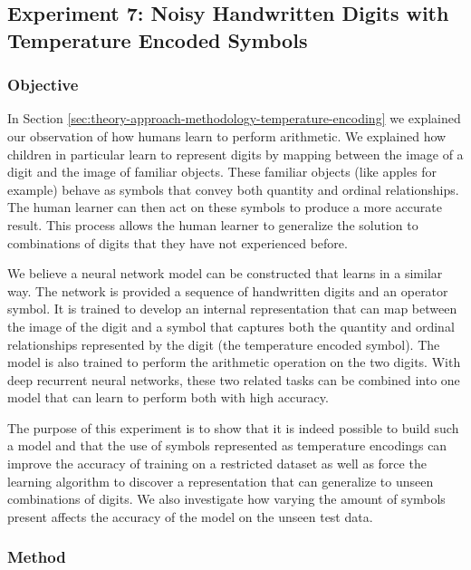 \subsection{Experiment 7: Noisy Handwritten Digits with Temperature Encoded Symbols} \label{sec:experiment-7}

\subsubsection{Objective}

In Section \ref{sec:theory-approach-methodology-temperature-encoding} we explained our observation of how humans learn to perform arithmetic. We explained how children in particular learn to represent digits by mapping between the image of a digit and the image of familiar objects. These familiar objects (like apples for example) behave as symbols that convey both quantity and ordinal relationships. The human learner can then act on these symbols to produce a more accurate result. This process allows the human learner to generalize the solution to combinations of digits that they have not experienced before.

We believe a neural network model can be constructed that learns in a similar way. The network is provided a sequence of handwritten digits and an operator symbol. It is trained to develop an internal representation that can map between the image of the digit and a symbol that captures both the quantity and ordinal relationships represented by the digit (the temperature encoded symbol). The model is also trained to perform the arithmetic operation on the two digits. With deep recurrent neural networks, these two related tasks can be combined into one model that can learn to perform both with high accuracy.

The purpose of this experiment is to show that it is indeed possible to build such a model and that the use of symbols represented as temperature encodings can improve the accuracy of training on a restricted dataset as well as force the learning algorithm to discover a representation that can generalize to unseen combinations of digits. We also investigate how varying the amount of symbols present affects the accuracy of the model on the unseen test data.

\subsubsection{Method}

